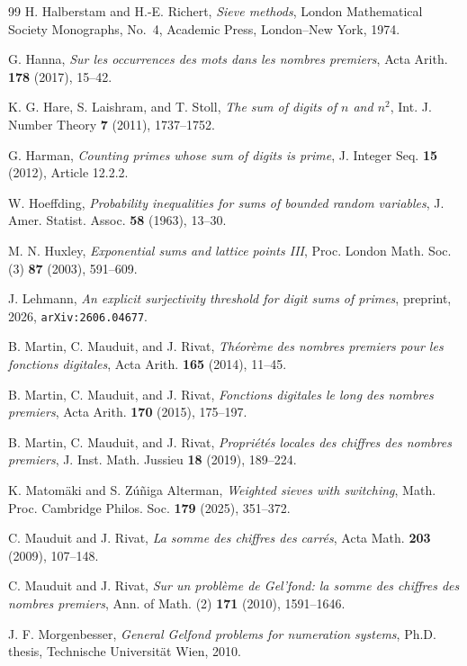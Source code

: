\documentclass[11pt,reqno]{amsart}
\theoremstyle{plain}
\theoremstyle{definition}
\newcommand{\1}{\mathbf 1}
\begin{document}
\begin{thebibliography}{99}
 H. Halberstam and H.-E. Richert, \emph{Sieve methods}, London Mathematical Society Monographs, No.~4, Academic Press, London--New York, 1974.

 G. Hanna, \emph{Sur les occurrences des mots dans les nombres premiers}, Acta Arith. \textbf{178} (2017), 15--42.

 K. G. Hare, S. Laishram, and T. Stoll, \emph{The sum of digits of $n$ and $n^2$}, Int. J. Number Theory \textbf{7} (2011), 1737--1752.

 G. Harman, \emph{Counting primes whose sum of digits is prime}, J. Integer Seq. \textbf{15} (2012), Article 12.2.2.

 W. Hoeffding, \emph{Probability inequalities for sums of bounded random variables}, J. Amer. Statist. Assoc. \textbf{58} (1963), 13--30.

 M. N. Huxley, \emph{Exponential sums and lattice points III}, Proc. London Math. Soc. (3) \textbf{87} (2003), 591--609.

 J. Lehmann, \emph{An explicit surjectivity threshold for digit sums of primes}, preprint, 2026, \texttt{arXiv:2606.04677}.

 B. Martin, C. Mauduit, and J. Rivat, \emph{Th\'eor\`eme des nombres premiers pour les fonctions digitales}, Acta Arith. \textbf{165} (2014), 11--45.

 B. Martin, C. Mauduit, and J. Rivat, \emph{Fonctions digitales le long des nombres premiers}, Acta Arith. \textbf{170} (2015), 175--197.

 B. Martin, C. Mauduit, and J. Rivat, \emph{Propri\'et\'es locales des chiffres des nombres premiers}, J. Inst. Math. Jussieu \textbf{18} (2019), 189--224.

 K. Matom\"aki and S. Z\'u\~niga Alterman, \emph{Weighted sieves with switching}, Math. Proc. Cambridge Philos. Soc. \textbf{179} (2025), 351--372.

 C. Mauduit and J. Rivat, \emph{La somme des chiffres des carr\'es}, Acta Math. \textbf{203} (2009), 107--148.

 C. Mauduit and J. Rivat, \emph{Sur un probl\`eme de Gel'fond: la somme des chiffres des nombres premiers}, Ann. of Math. (2) \textbf{171} (2010), 1591--1646.

 J. F. Morgenbesser, \emph{General Gelfond problems for numeration systems}, Ph.D. thesis, Technische Universit\"at Wien, 2010.


\end{thebibliography}
\end{document}
